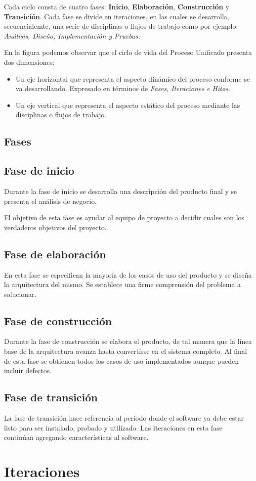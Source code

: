 Cada ciclo consta de cuatro fases: \textbf{Inicio}, \textbf{Elaboración}, \textbf{Construcción} y \textbf{Transición}. Cada fase se divide en iteraciones, en las cuales se desarrolla, secuencialemte, una serie de disciplinas o flujos de trabajo como por ejemplo: \textit{Análisis, Diseño, Implementación y Pruebas.}

En la figura podemos observar que el ciclo de vida del Proceso Unificado presenta dos dimensiones:
\begin{itemize}
	\item Un eje horizontal que representa el aspecto dinámico del proceso conforme se va desarrollando. Expresado en términos de \textit{Fases, Iteraciones e Hitos}.
	\item Un eje vertical que representa el aspecto estático del proceso mediante las disciplinas o flujos de trabajo.
\end{itemize}


\subsection{Fases}

\subsection{Fase de inicio}
Durante la fase de inicio se desarrolla una descripción del producto final y se presenta el análisis de negocio.

El objetivo de esta fase es ayudar al equipo de proyecto a decidir cuales son los verdaderos objetivos del proyecto.

\subsection{Fase de elaboración}
En esta fase se especifican la mayoría de los casos de uso del producto y se diseña la arquitectura del mismo. Se establece una firme comprensión del problema a solucionar.


\subsection{Fase de construcción}
Durante la fase de construcción se elabora el producto, de tal manera que la línea base de la arquitectura avanza hasta convertirse en el sistema completo. Al final de esta fase se obtienen todos los casos de uso implementados aunque pueden incluir defectos.


\subsection{Fase de transición}
La fase de transición hace referencia al período donde el software ya debe estar listo para ser instalado, probado y utilizado. Las iteraciones en esta fase continúan agregando características al software.

\section{Iteraciones}
